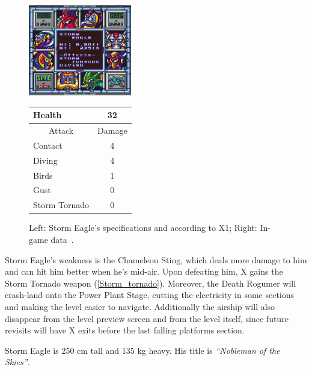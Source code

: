 \begin{figure}[htp]
	\begin{minipage}[c]{0.45\linewidth}
		\vspace{0pt}
		\centering
		\includegraphics[height=4cm]{figures/X1/Storm_eagle/Storm_eagle_specs.png}
	\end{minipage}
	\begin{minipage}[c]{0.45\linewidth}
		\centering
		\vspace{0pt}
		\begin{tabular}[h]{l c}
			\toprule
			Health  & 32\\
			\midrule
			\multicolumn{1}{c}{Attack} & \multicolumn{1}{c}{Damage}\\
			Contact & 4\\
			Diving & 4\\
			Birds & 1\\
			Gust & 0\\
			Storm Tornado & 0\\
			\bottomrule
		\end{tabular}
	\end{minipage}
	\caption{Left: Storm Eagle's specifications and according to X1; Right: In-game data~\cite{wiki:Storm_eagle}. }
	\label{Eagle_specs}
\end{figure}
Storm Eagle's weakness is the Chameleon Sting, which deals more damage to him and can hit him better when he's mid-air. Upon defeating him, X gains the Storm Tornado weapon (\ref{Storm_tornado}). Moreover, the Death Rogumer will crash-land onto the Power Plant Stage, cutting the electricity in some sections and making the level easier to navigate. Additionally the airship will also disappear from the level preview screen and from the level itself, since future revisits will have X exits before the last falling platforms section.

Storm Eagle is 250 cm tall and 135 kg heavy. His title is \textit{``Nobleman of the Skies''}. 


